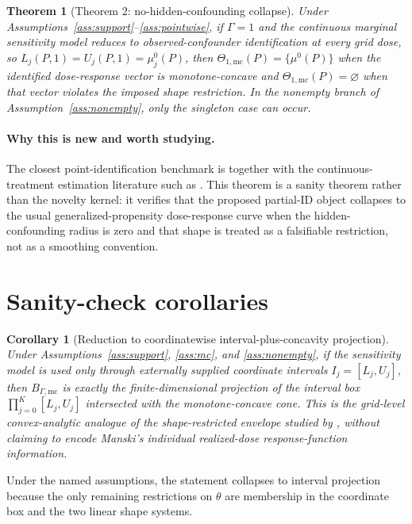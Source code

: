 \documentclass[11pt]{article}
\theoremstyle{definition}
\theoremstyle{plain}
\newtheorem{theorem}{Theorem}
\newtheorem{corollary}{Corollary}
\theoremstyle{remark}
\begin{document}
\begin{theorem}[Theorem 2: no-hidden-confounding collapse]\label{thm:gamma-one}
Under Assumptions~\ref{ass:support}--\ref{ass:pointwise}, if \(\Gamma=1\) and the continuous marginal sensitivity model reduces to observed-confounder identification at every grid dose, so \(L_j(P,1)=U_j(P,1)=\mu_j^{0}(P)\), then \(\Theta_{1,\mathrm{mc}}(P)=\{\mu^0(P)\}\) when the identified dose-response vector is monotone-concave and \(\Theta_{1,\mathrm{mc}}(P)=\varnothing\) when that vector violates the imposed shape restriction.  In the nonempty branch of Assumption~\ref{ass:nonempty}, only the singleton case can occur.
\end{theorem}

\paragraph{Why this is new and worth studying.}
The closest point-identification benchmark is \citet{Imbens2000} together with the continuous-treatment estimation literature such as \citet{KennedyMaMcHughSmall2017}.  This theorem is a sanity theorem rather than the novelty kernel: it verifies that the proposed partial-ID object collapses to the usual generalized-propensity dose-response curve when the hidden-confounding radius is zero and that shape is treated as a falsifiable restriction, not as a smoothing convention.

\section{Sanity-check corollaries}
\begin{corollary}[Reduction to coordinatewise interval-plus-concavity projection]\label{cor:interval-projection}
Under Assumptions~\ref{ass:support}, \ref{ass:mc}, and \ref{ass:nonempty}, if the sensitivity model is used only through externally supplied coordinate intervals \(I_j=[L_j,U_j]\), then \(B_{\Gamma,\mathrm{mc}}\) is exactly the finite-dimensional projection of the interval box \(\prod_{j=0}^K[L_j,U_j]\) intersected with the monotone-concave cone.  This is the grid-level convex-analytic analogue of the shape-restricted envelope studied by \citet{Manski1997}, without claiming to encode Manski's individual realized-dose response-function information.
\end{corollary}

Under the named assumptions, the statement collapses to interval projection because the only remaining restrictions on \(\theta\) are membership in the coordinate box and the two linear shape systems.
\end{document}
